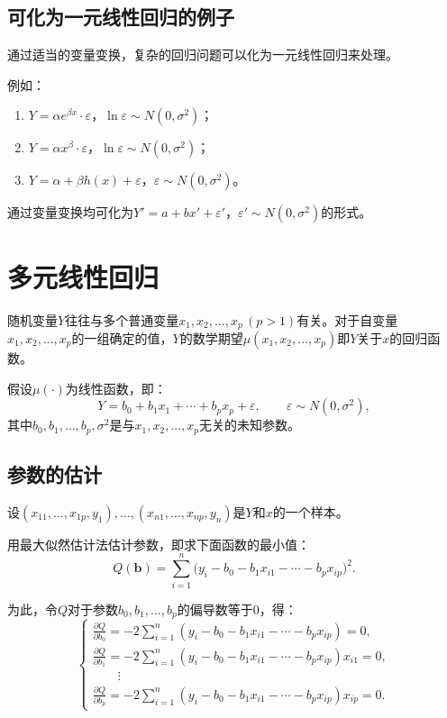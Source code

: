 \documentclass[11pt,a4paper]{report}
\theoremstyle{definition}
\begin{document}
\subsection{可化为一元线性回归的例子}

通过适当的变量变换，复杂的回归问题可以化为一元线性回归来处理。

例如：
\begin{enumerate}[label=\arabic*.,leftmargin=2em]
    \item $Y=\alpha e^{\beta x}\cdot\varepsilon$，$\ln\varepsilon\sim N(0,\sigma^{2})$；
    \item $Y=\alpha x^{\beta}\cdot\varepsilon$，$\ln\varepsilon\sim N(0,\sigma^{2})$；
    \item $Y=\alpha+\beta h(x)+\varepsilon$，$\varepsilon\sim N(0,\sigma^{2})$。
\end{enumerate}
通过变量变换均可化为$Y'=a+bx'+\varepsilon'$，$\varepsilon'\sim N(0,\sigma^{2})$的形式。

\section{多元线性回归}

随机变量$Y$往往与多个普通变量$x_{1},x_{2},\ldots,x_{p}\,(p>1)$有关。对于自变量$x_{1},x_{2},\ldots,x_{p}$的一组确定的值，$Y$的数学期望$\mu(x_{1},x_{2},\ldots,x_{p})$即$Y$关于$x$的回归函数。

假设$\mu(\cdot)$为线性函数，即：
\[
Y=b_{0}+b_{1}x_{1}+\cdots+b_{p}x_{p}+\varepsilon,\qquad\varepsilon\sim N(0,\sigma^{2}),
\]
其中$b_{0},b_{1},\ldots,b_{p},\sigma^{2}$是与$x_{1},x_{2},\ldots,x_{p}$无关的未知参数。

\subsection{参数的估计}

设$(x_{11},\ldots,x_{1p},y_{1}),\ldots,(x_{n1},\ldots,x_{np},y_{n})$是$Y$和$x$的一个样本。

用最大似然估计法估计参数，即求下面函数的最小值：
\[
Q(\boldsymbol{b})=\sum_{i=1}^{n}\bigl(y_{i}-b_{0}-b_{1}x_{i1}-\cdots-b_{p}x_{ip}\bigr)^{2}.
\]

为此，令$Q$对于参数$b_{0},b_{1},\ldots,b_{p}$的偏导数等于0，得：
\[
\begin{cases}
\displaystyle\frac{\partial Q}{\partial b_{0}}=-2\sum_{i=1}^{n}(y_{i}-b_{0}-b_{1}x_{i1}-\cdots-b_{p}x_{ip})=0,\\[0.8em]
\displaystyle\frac{\partial Q}{\partial b_{1}}=-2\sum_{i=1}^{n}(y_{i}-b_{0}-b_{1}x_{i1}-\cdots-b_{p}x_{ip})x_{i1}=0,\\[0.8em]
\qquad\vdots\\[0.3em]
\displaystyle\frac{\partial Q}{\partial b_{p}}=-2\sum_{i=1}^{n}(y_{i}-b_{0}-b_{1}x_{i1}-\cdots-b_{p}x_{ip})x_{ip}=0.
\end{cases}
\]
\end{document}
